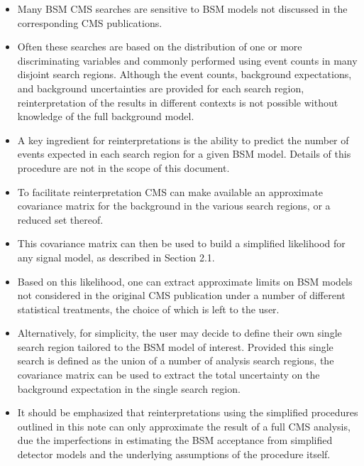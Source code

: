 \begin{itemize}

\item Many BSM CMS searches are sensitive to BSM models not discussed in
the corresponding CMS publications.

\item Often these searches are based on the distribution of one or more 
discriminating variables and commonly performed using event counts 
in many disjoint search regions.  Although the event counts, background
expectations, and background uncertainties are provided for each search region,
reinterpretation of the results in different contexts is not possible
without knowledge of the full background model.

\item A key ingredient for reinterpretations is the ability to predict
the number of events expected in each search region for a given BSM model.
Details of this procedure are not in the scope of this document.

\item To facilitate reinterpretation CMS can make available an
approximate covariance matrix for the background in the 
various search regions, or a reduced set thereof.

\item This covariance matrix can then be used to build a simplified
likelihood for any signal model, as described in Section 2.1.

\item Based on this likelihood, one can extract approximate limits
on BSM models not considered in the original CMS publication under 
a number of different statistical treatments, the choice of which 
is left to the user.

\item Alternatively, for simplicity, the user may decide to define
their own single search region tailored to the BSM model of interest.  
Provided this single search is defined as the union of a number of analysis
search regions, the covariance matrix can be used to extract the total uncertainty
on the background expectation in the single search region.

\item It should be emphasized that reinterpretations using the simplified procedures 
outlined in this note can only approximate the result of a full CMS
analysis, due the imperfections in estimating the BSM
acceptance from simplified detector models and the underlying assumptions of the 
procedure itself.

\end{itemize} 


